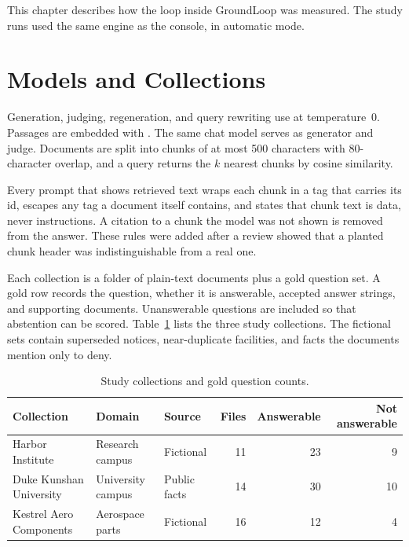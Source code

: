 \documentclass[12pt, a4paper, oneside]{report}
\newcommand{\code}[1]{\texttt{\detokenize{#1}}}
\begin{document}
This chapter describes how the loop inside GroundLoop was measured. The
study runs used the same engine as the console, in automatic mode.

\section{Models and Collections}

Generation, judging, regeneration, and query rewriting use
\code{gpt-4o-mini} at temperature~0. Passages are embedded with
\code{text-embedding-3-small}. The same chat model serves as generator and
judge. Documents are split into chunks of at most 500 characters with
80-character overlap, and a query returns the $k$ nearest chunks by cosine
similarity.

Every prompt that shows retrieved text wraps each chunk in a tag that
carries its id, escapes any tag a document itself contains, and states that
chunk text is data, never instructions. A citation to a chunk the model was
not shown is removed from the answer. These rules were added after a review
showed that a planted chunk header was indistinguishable from a real one.

Each collection is a folder of plain-text documents plus a gold question
set. A gold row records the question, whether it is answerable, accepted
answer strings, and supporting documents. Unanswerable questions are
included so that abstention can be scored. Table~\ref{tbl:corpora} lists
the three study collections. The fictional sets contain superseded notices,
near-duplicate facilities, and facts the documents mention only to deny.

\begin{table}[htbp]
\centering
\footnotesize
\setlength{\tabcolsep}{5pt}
\begin{tabular}{@{}lllrrr@{}}
\toprule
Collection & Domain & Source & Files & Answerable & Not answerable \\
\midrule
Harbor Institute & Research campus & Fictional & 11 & 23 & 9 \\
Duke Kunshan University & University campus & Public facts & 14 & 30 & 10 \\
Kestrel Aero Components & Aerospace parts & Fictional & 16 & 12 & 4 \\
\bottomrule
\end{tabular}
\caption{Study collections and gold question counts.}
\label{tbl:corpora}
\end{table}
\end{document}
